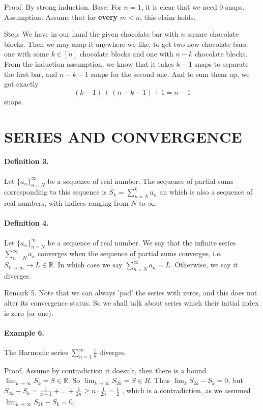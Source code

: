 Proof. By strong induction. Base: For \(n = 1\), it is clear that we need \(0\) snaps. Assumption: Assume that for \textbf{every} \(m < n \), this claim holds.


Step: We have in our hand the given chocolate bar with \(n\) square chocolate blocks. Then we may snap it anywhere we like, to get two new chocolate bars: one with some \( k \in [n]\) chocolate blocks and one with \(n - k\) chocolate blocks. From the induction assumption, we know that it takes \(k - 1\) snaps to separate the first bar, and \(n - k - 1\) snaps for the second one. And to sum them up, we got exactly \[ (k - 1) + (n - k - 1) + 1 = n - 1 \] snaps.

\section{SERIES AND CONVERGENCE}

\paragraph{Definition 3.} Let \( \{a_n\}^{\infty}_{n = N} \) be a sequence of real number. The sequence of partial sums corresponding to this sequence is \(S_k = \sum^{k}_{n=N}{a_n} \) an which is also a sequence of real numbers, with indices ranging from \(N\) to \(\infty\).
\paragraph{Definition 4.} Let \( \{a_n\}^{\infty}_{n=N} \) be a sequence of real number. We say that the infinite series \( \sum^{\infty}_{n=N}{a_n} \)  converges when the sequence of partial sums converges, i.e. \(S_{k \rightarrow \infty} \rightarrow L \in \mathbb{R} \). In which case we say \( \sum^{\infty}_{n=N}{a_n} = L \). Otherwise, we say it diverges.

Remark 5. Note that we can always ’pad’ the series with zeros, and this does not alter its convergence status. So we shall talk about series which their initial index is zero (or one).
\paragraph{Example 6.} The Harmonic series \( \sum^{\infty}_{n=1}{\frac{1}{n}}\) diverges.

Proof. Assume by contradiction it doesn’t, then there is a bound \( \lim_{k\rightarrow \infty} S_k = S \in \mathbb{R} \). So \(\lim_{k\rightarrow \infty} S_{2k} = S \in  R \). Thus \( \lim_{k} S_{2k}-S_{k} = 0 \), but \( S_{2k}-S_{k} = \frac{1}{n+1} + ... + \frac{1}{2n} \ge n \cdot \frac{1}{2n} = \frac{1}{2} \)
, which is a contradiction, as we assumed \( \lim_{k\rightarrow \infty} S_{2k}-S_{k} = 0 \).

